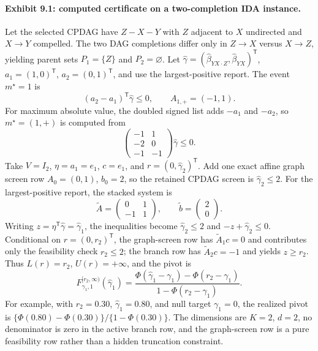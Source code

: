 \documentclass[11pt]{article}
\newcommand{\transpose}{\mathsf{T}}
\theoremstyle{definition}
\theoremstyle{plain}
\theoremstyle{remark}
\begin{document}
\paragraph{Exhibit 9.1: computed certificate on a two-completion IDA instance.}
Let the selected CPDAG have \(Z-X-Y\) with \(Z\) adjacent to \(X\) undirected and \(X\to Y\) compelled. The two DAG completions differ only in \(Z\to X\) versus \(X\to Z\), yielding parent sets \(P_1=\{Z\}\) and \(P_2=\varnothing\). Let \(\hat\gamma=(\hat\beta_{YX\cdot Z},\hat\beta_{YX})^\transpose\), \(a_1=(1,0)^\transpose\), \(a_2=(0,1)^\transpose\), and use the largest-positive report. The event \(m^\star=1\) is
\[
(a_2-a_1)^\transpose\hat\gamma\le0,\qquad
A_{1,+}=(-1,1).
\]
For maximum absolute value, the doubled signed list adds \(-a_1\) and \(-a_2\), so \(m^\star=(1,+)\) is computed from
\[
\begin{pmatrix}
-1&1\\
-2&0\\
-1&-1
\end{pmatrix}\hat\gamma\le0.
\]
Take \(V=I_2\), \(\eta=a_1=e_1\), \(c=e_1\), and \(r=(0,\hat\gamma_2)^\transpose\). Add one exact affine graph screen row \(A_0=(0,1)\), \(b_0=2\), so the retained CPDAG screen is \(\hat\gamma_2\le2\). For the largest-positive report, the stacked system is
\[
\tilde A=\begin{pmatrix}0&1\\-1&1\end{pmatrix},\qquad
\tilde b=\begin{pmatrix}2\\0\end{pmatrix}.
\]
Writing \(z=\eta^\transpose\hat\gamma=\hat\gamma_1\), the inequalities become \(\hat\gamma_2\le2\) and \(-z+\hat\gamma_2\le0\). Conditional on \(r=(0,r_2)^\transpose\), the graph-screen row has \(\tilde A_1c=0\) and contributes only the feasibility check \(r_2\le2\); the branch row has \(\tilde A_2c=-1\) and yields \(z\ge r_2\). Thus \(L(r)=r_2\), \(U(r)=+\infty\), and the pivot is
\[
F^{[r_2,\infty)}_{\gamma_1,1}(\hat\gamma_1)
=
\frac{\Phi(\hat\gamma_1-\gamma_1)-\Phi(r_2-\gamma_1)}
{1-\Phi(r_2-\gamma_1)}.
\]
For example, with \(r_2=0.30\), \(\hat\gamma_1=0.80\), and null target \(\gamma_1=0\), the realized pivot is \(\{\Phi(0.80)-\Phi(0.30)\}/\{1-\Phi(0.30)\}\). The dimensions are \(K=2\), \(d=2\), no denominator is zero in the active branch row, and the graph-screen row is a pure feasibility row rather than a hidden truncation constraint.
\end{document}
